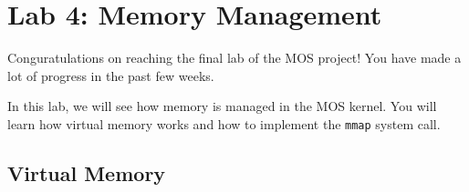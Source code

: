 \chapter{Lab 4: Memory Management}

Conguratulations on reaching the final lab of the MOS project! You have
made a lot of progress in the past few weeks.

In this lab, we will see how memory is managed in the MOS kernel. You will
learn how virtual memory works and how to implement the \texttt{mmap} system call.

\section{Virtual Memory}
